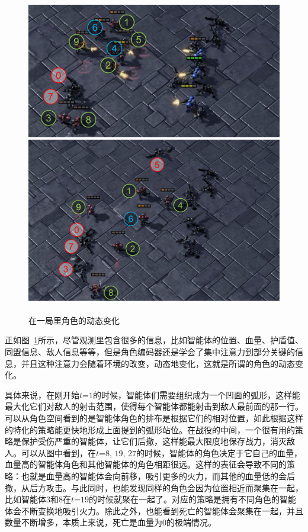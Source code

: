 \begin{figure}
    \includegraphics[height=0.24\linewidth]{figures/dynamic/10m_vs_11m-g3.pdf}\hfill
    \includegraphics[height=0.24\linewidth]{figures/dynamic/10m_vs_11m-g4.pdf}\\ 
    \hfill
    \caption{在一局里角色的动态变化}\label{fig:dynamic_role-10m_vs_11m}
\end{figure}
正如图~\ref{fig:dynamic_role-10m_vs_11m}所示，尽管观测里包含很多的信息，比如智能体的位置、血量、护盾值、同盟信息、敌人信息等等，但是角色编码器还是学会了集中注意力到部分关键的信息，并且这种注意力会随着环境的改变，动态地变化，这就是所谓的角色的动态变化。

具体来说，在刚开始$t$=$1$的时候，智能体们需要组织成为一个凹面的弧形，这样能最大化它们对敌人的射击范围，使得每个智能体都能射击到敌人最前面的那一行。可以从角色空间看到的是智能体角色的排布是根据它们的相对位置，如此根据这样的特化的策略能更快地形成上面提到的弧形站位。在战役的中间，一个很有用的策略是保护受伤严重的智能体，让它们后撤，这样能最大限度地保存战力，消灭敌人。可以从图中看到，在$t$=$8$, $19$, $27$的时候，智能体的角色决定于它自己的血量，血量高的智能体角色和其他智能体的角色相距很远。这样的表征会导致不同的策略：也就是血量高的智能体会向前移，吸引更多的火力，而其他的血量低的会后撤，从后方攻击。与此同时，也能发现同样的角色会因为位置相近而聚集在一起，比如智能体$3$和$8$在$t$=$19$的时候就聚在一起了。对应的策略是拥有不同角色的智能体会不断变换地吸引火力。除此之外，也能看到死亡的智能体会聚集在一起，并且数量不断增多，本质上来说，死亡是血量为$0$的极端情况。

